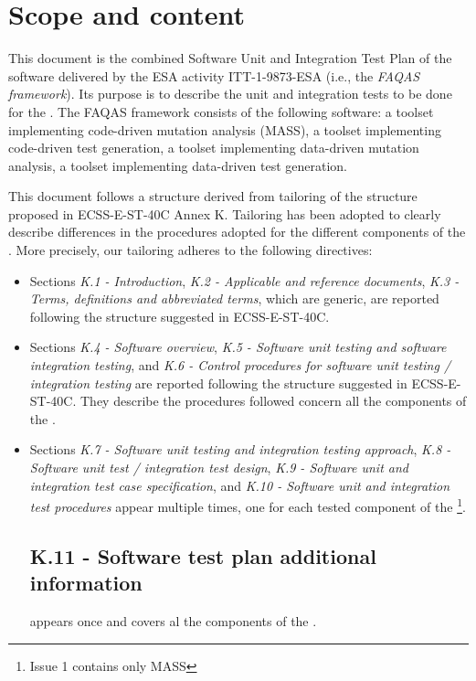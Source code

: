 
\chapter{Scope and content}

This document is the combined Software Unit and Integration Test Plan of the software delivered by the ESA activity ITT-1-9873-ESA (i.e., the \emph{FAQAS framework}). Its purpose is to describe the unit and integration tests to be done for the \FAQAS.
The FAQAS framework consists of the following software: a toolset  implementing code-driven mutation analysis (MASS), a toolset implementing code-driven test generation, a toolset implementing data-driven mutation analysis, a toolset implementing data-driven test generation.

This document follows a structure derived from tailoring of the structure proposed in ECSS-E-ST-40C Annex K. Tailoring has been adopted to clearly describe differences in the procedures adopted for the different components of the \FAQAS. More precisely, our tailoring adheres to the following directives:

\begin{itemize}
\item Sections 
\emph{K.1 - Introduction}, 
\emph{K.2 - Applicable and reference documents}, 
\emph{K.3 - Terms, definitions and abbreviated terms}, which are generic, are reported following the structure suggested in ECSS-E-ST-40C. 

\item Sections \emph{K.4 - Software overview}, \emph{K.5 - Software unit testing and software integration testing}, 
 and \emph{K.6 - Control procedures for software unit testing / integration testing} are reported following the structure suggested in ECSS-E-ST-40C. They describe the procedures followed concern all the components of the \FAQAS.
 
\item Sections \emph{K.7 - Software unit testing and integration testing approach}, 
\emph{K.8 - Software unit test / integration test design},
 \emph{K.9 - Software unit and integration test case specification},
 and \emph{K.10 - Software unit and integration test procedures} appear multiple times, one for each tested component of the \FAQAS\footnote{Issue 1 contains only MASS}. 
 
\section{K.11 - Software test plan additional information} appears once and covers al the components of the \FAQAS.
\end{itemize}
 
